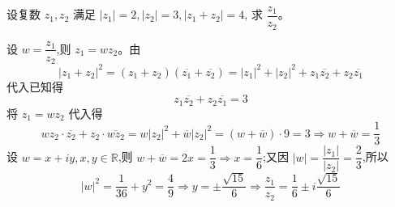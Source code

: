 \begin{questions}
        
        
        



    \question 设复数 $z_1, z_2$ 满足 $|z_1|=2,|z_2|=3,|z_1+z_2|=4$, 求 $\dfrac{z_1}{z_2}$。 
    \begin{solution}
        设 $w = \dfrac{z_1}{z_2}$,则 $z_1 = w z_2$。由
        \[
        |z_1 + z_2|^2 = (z_1 + z_2)(\overline{z_1} + \overline{z_2}) = |z_1|^2 + |z_2|^2 + z_1\overline{z_2} + z_2\overline{z_1}
        \]
        代入已知得
        \[
        z_1\overline{z_2} + z_2\overline{z_1} = 3
        \]
        将 $z_1 = w z_2$ 代入得
        \[
        wz_2 \cdot \overline{z_2} + z_2 \cdot \overline{w z_2} = w |z_2|^2 + \overline{w} |z_2|^2 = (w + \overline{w}) \cdot 9=3 \Rightarrow w + \overline{w} = \frac{1}{3}
        \]
        设 $w = x + iy,x,y\in \mathbb{R}$,则 $w + \overline{w} = 2x = \dfrac{1}{3} \Rightarrow x = \dfrac{1}{6}$;又因 $|w| = \dfrac{|z_1|}{|z_2|} = \dfrac{2}{3}$,所以
        \[
        |w|^2 = \frac{1}{36} + y^2 = \frac{4}{9}
        \Rightarrow y = \pm \frac{\sqrt{15}}{6} \Rightarrow   \frac{z_1}{z_2} = \frac{1}{6} \pm i \frac{\sqrt{15}}{6}
        \]
    \end{solution}


\end{questions}
